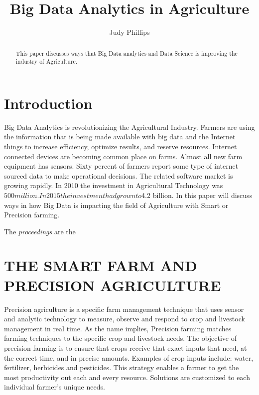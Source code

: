 \documentclass[sigconf]{acmart}
\begin{document}
\title{Big Data Analytics in Agriculture}


\author{Judy Phillips}

\renewcommand{\shortauthors}{B. Trovato et al.}


\begin{abstract}
This paper discusses ways that Big Data analytics and Data Science is improving the industry of Agriculture.
\end{abstract}



\maketitle

\section{Introduction}

Big Data Analytics is revolutionizing the Agricultural Industry. Farmers are using the information that is being made available with big data and the Internet things to increase efficiency, optimize results, and reserve resources. Internet connected devices are becoming common place on farms.  Almost all new farm equipment has sensors. Sixty percent of farmers report some type of internet sourced data to make operational decisions. The related software market is growing rapidly. In 2010 the investment in Agricultural Technology was $500 million. In 2015 the investment had grown to $4.2 billion.  In this paper will discuss ways in how Big Data is impacting the field of Agriculture with Smart or Precision farming.

The \textit{proceedings} are the \cite{VanGundy09}

\section{THE SMART FARM AND PRECISION AGRICULTURE}

Precision agriculture is a specific farm management technique that uses sensor and analytic technology to measure, observe and respond to crop and livestock management in real time.
As the name implies, Precision farming matches farming techniques to the specific crop and livestock needs. The objective of precision farming is to ensure that crops receive that exact inputs that need, at the correct time, and in precise amounts. Examples of crop inputs include: water, fertilizer, herbicides and pesticides. This strategy enables a farmer to get the most productivity out each and every resource. Solutions are customized to each individual farmer’s unique needs.
\end{document}
